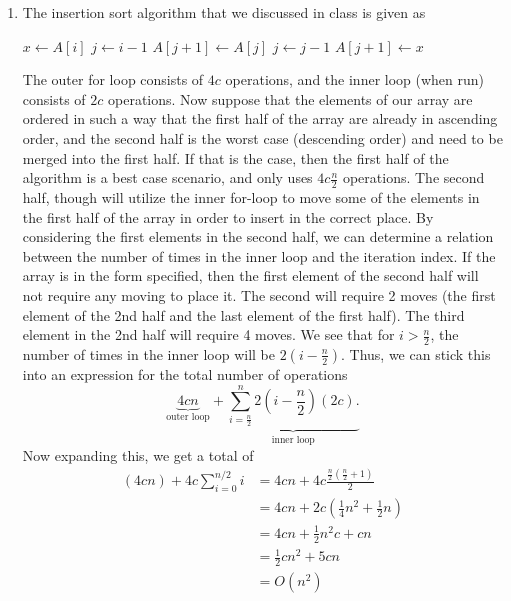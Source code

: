 \documentclass{article}
\begin{document}
\begin{enumerate}[label=(\alph*)]
\item[] The insertion sort algorithm that we discussed in class is
  given as
  \begin{algorithmic}
    \State $x\gets A[i]$
    \State $j \gets i-1$
    \State $A[j+1]\gets A[j]$
    \State $j \gets j-1$
    \EndWhile
    \State $A[j+1]\gets x$
    \EndFor
  \end{algorithmic}
The outer for loop consists of $4c$ operations, and the inner loop
(when run) consists of $2c$ operations.
Now suppose that  the elements of our array are ordered in such a  way
that the first half of the array are already in ascending order, and
the second half is the worst case (descending order) and need to be
merged into the first half.  If that is the case, then the first half
of the algorithm is a best case scenario, and only uses
$4c\frac{n}{2}$ operations.  The second half, though will utilize the
inner for-loop to move some of the elements in the first half of the
array in order to insert in the correct place. 
By considering the first elements in the second half, we can determine
a relation between the number of times in the inner loop and the
iteration index.  If the array is in the form specified, then the
first element of the second half will not require any moving to place
it.  The second will require 2 moves (the first element of the 2nd
half and the last element of the first half).  The third element in
the 2nd half will require 4 moves.  We see that for $i > \frac{n}{2}$,
the number of times in the inner loop will be $2(i-\frac{n}{2})$.
Thus, we can stick this into an expression for the total number of
operations
\begin{equation}
  \underbrace{4cn}_{\text{outer loop}} + \underbrace{\sum_{i =
    \frac{n}{2}}^n2\left(i-\frac{n}{2}\right)\left(2c\right).
}_{\text{inner loop}} 
\end{equation}
Now expanding this, we get a total of 
\begin{equation}
\begin{split}
  (4cn) + 4c\sum_{i=0}^{n/2}i &= 4cn +
  4c\frac{\frac{n}{2}\left(\frac{n}{2} + 1\right)}{2}\\
  &= 4cn + 2c\left(\frac{1}{4}n^2 + \frac{1}{2}n\right)\\
  &= 4cn + \frac{1}{2}n^2c + cn\\
  &= \frac{1}{2}cn^2 + 5cn\\
  &= O(n^2)
\end{split}
\end{equation}


\end{enumerate}
\end{document}
